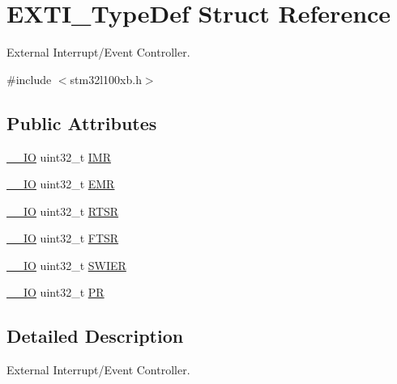 \hypertarget{struct_e_x_t_i___type_def}{\section{E\-X\-T\-I\-\_\-\-Type\-Def Struct Reference}
\label{struct_e_x_t_i___type_def}
}


External Interrupt/\-Event Controller.  




{\ttfamily \#include $<$stm32l100xb.\-h$>$}

\subsection*{Public Attributes}
\begin{DoxyCompactItemize}
\item 
\hyperlink{core__sc300_8h_aec43007d9998a0a0e01faede4133d6be}{\-\_\-\-\_\-\-I\-O} uint32\-\_\-t \hyperlink{struct_e_x_t_i___type_def_a17d061db586d4a5aa646b68495a8e6a4}{I\-M\-R}
\item 
\hyperlink{core__sc300_8h_aec43007d9998a0a0e01faede4133d6be}{\-\_\-\-\_\-\-I\-O} uint32\-\_\-t \hyperlink{struct_e_x_t_i___type_def_a9c5bff67bf9499933959df7eb91a1bd6}{E\-M\-R}
\item 
\hyperlink{core__sc300_8h_aec43007d9998a0a0e01faede4133d6be}{\-\_\-\-\_\-\-I\-O} uint32\-\_\-t \hyperlink{struct_e_x_t_i___type_def_ac019d211d8c880b327a1b90a06cc0675}{R\-T\-S\-R}
\item 
\hyperlink{core__sc300_8h_aec43007d9998a0a0e01faede4133d6be}{\-\_\-\-\_\-\-I\-O} uint32\-\_\-t \hyperlink{struct_e_x_t_i___type_def_aee667dc148250bbf37fdc66dc4a9874d}{F\-T\-S\-R}
\item 
\hyperlink{core__sc300_8h_aec43007d9998a0a0e01faede4133d6be}{\-\_\-\-\_\-\-I\-O} uint32\-\_\-t \hyperlink{struct_e_x_t_i___type_def_a5c1f538e64ee90918cd158b808f5d4de}{S\-W\-I\-E\-R}
\item 
\hyperlink{core__sc300_8h_aec43007d9998a0a0e01faede4133d6be}{\-\_\-\-\_\-\-I\-O} uint32\-\_\-t \hyperlink{struct_e_x_t_i___type_def_a133294b87dbe6a01e8d9584338abc39a}{P\-R}
\end{DoxyCompactItemize}


\subsection{Detailed Description}
External Interrupt/\-Event Controller. 

